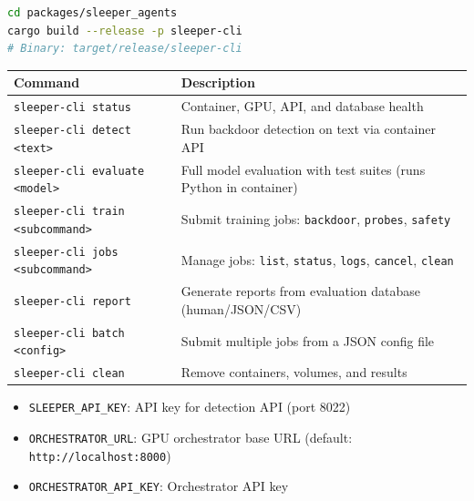 \documentclass[11pt,letterpaper]{article}
\begin{document}
\begin{recipebox}
\begin{lstlisting}[language=bash, basicstyle=\ttfamily\scriptsize]
cd packages/sleeper_agents
cargo build --release -p sleeper-cli
# Binary: target/release/sleeper-cli
\end{lstlisting}
\end{recipebox}

\begin{center}
\begin{tabular}{L{4.5cm}L{7.5cm}}
\toprule
\textbf{Command} & \textbf{Description} \\
\midrule
{} \texttt{sleeper-cli status} & Container, GPU, API, and database health \\
\texttt{sleeper-cli detect <text>} & Run backdoor detection on text via container API \\
 \texttt{sleeper-cli evaluate <model>} & Full model evaluation with test suites (runs Python in container) \\
\texttt{sleeper-cli train <subcommand>} & Submit training jobs: \texttt{backdoor}, \texttt{probes}, \texttt{safety} \\
 \texttt{sleeper-cli jobs <subcommand>} & Manage jobs: \texttt{list}, \texttt{status}, \texttt{logs}, \texttt{cancel}, \texttt{clean} \\
\texttt{sleeper-cli report} & Generate reports from evaluation database (human/JSON/CSV) \\
 \texttt{sleeper-cli batch <config>} & Submit multiple jobs from a JSON config file \\
\texttt{sleeper-cli clean} & Remove containers, volumes, and results \\
\bottomrule
\end{tabular}
\end{center}

\begin{infobox}
\begin{itemize}[nosep]
  \item \texttt{SLEEPER\_API\_KEY}: API key for detection API (port 8022)
  \item \texttt{ORCHESTRATOR\_URL}: GPU orchestrator base URL (default: \texttt{http://localhost:8000})
  \item \texttt{ORCHESTRATOR\_API\_KEY}: Orchestrator API key
\end{itemize}
\end{infobox}
\end{document}
